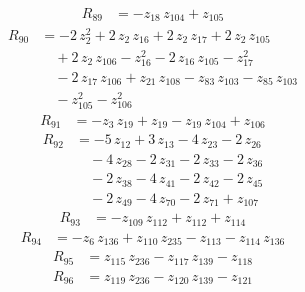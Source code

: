 \begin{equation*}\begin{aligned}
R_{89}&=-z_{18}\,z_{104} +z_{105}
\end{aligned}\end{equation*}
\begin{equation*}\begin{aligned}
R_{90}&=-2\,z_{2}^{2} +2\,z_{2}\,z_{16} +2\,z_{2}\,z_{17} +2\,z_{2}\,z_{105} \\
&\quad +2\,z_{2}\,z_{106} -z_{16}^{2} -2\,z_{16}\,z_{105} -z_{17}^{2} \\
&\quad -2\,z_{17}\,z_{106} +z_{21}\,z_{108} -z_{83}\,z_{103} -z_{85}\,z_{103} \\
&\quad -z_{105}^{2} -z_{106}^{2}
\end{aligned}\end{equation*}
\begin{equation*}\begin{aligned}
R_{91}&=-z_{3}\,z_{19} +z_{19} -z_{19}\,z_{104} +z_{106}
\end{aligned}\end{equation*}
\begin{equation*}\begin{aligned}
R_{92}&=-5\,z_{12} +3\,z_{13} -4\,z_{23} -2\,z_{26} \\
&\quad -4\,z_{28} -2\,z_{31} -2\,z_{33} -2\,z_{36} \\
&\quad -2\,z_{38} -4\,z_{41} -2\,z_{42} -2\,z_{45} \\
&\quad -2\,z_{49} -4\,z_{70} -2\,z_{71} +z_{107}
\end{aligned}\end{equation*}
\begin{equation*}\begin{aligned}
R_{93}&=-z_{109}\,z_{112} +z_{112} +z_{114}
\end{aligned}\end{equation*}
\begin{equation*}\begin{aligned}
R_{94}&=-z_{6}\,z_{136} +z_{110}\,z_{235} -z_{113} -z_{114}\,z_{136}
\end{aligned}\end{equation*}
\begin{equation*}\begin{aligned}
R_{95}&=z_{115}\,z_{236} -z_{117}\,z_{139} -z_{118}
\end{aligned}\end{equation*}
\begin{equation*}\begin{aligned}
R_{96}&=z_{119}\,z_{236} -z_{120}\,z_{139} -z_{121}
\end{aligned}\end{equation*}
